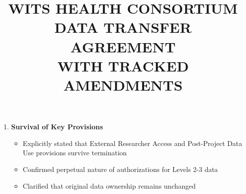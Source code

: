 \begin{enumerate}
\item \textbf{Survival of Key Provisions}
   \begin{itemize}
   \item Explicitly stated that External Researcher Access and Post-Project Data Use provisions survive termination
   \item Confirmed perpetual nature of authorizations for Levels 2-3 data
   \item Clarified that original data ownership remains unchanged
   \end{itemize}
\end{enumerate}

\documentclass[12pt,letterpaper]{article}
\usepackage{geometry}
\geometry{margin=1in}
\usepackage{titlesec}
\usepackage{enumitem}
\usepackage{xcolor}
\usepackage{soul} %
\usepackage{ulem} %
\usepackage{hyperref}
\hypersetup{
    colorlinks=true,
    linkcolor=blue,
    filecolor=magenta,
    urlcolor=blue,
}


\newcommand{\deleted}[1]{\textcolor{deletecolor}{\sout{#1}}}
\newcommand{\added}[1]{\textcolor{addcolor}{#1}}

\titleformat{\section}
  {\normalfont\Large\bfseries}{\thesection}{1em}{}
\titleformat{\subsection}
  {\normalfont\large\bfseries}{\thesubsection}{1em}{}


\title{\textbf{WITS HEALTH CONSORTIUM\\DATA TRANSFER AGREEMENT\\WITH TRACKED AMENDMENTS}}
\author{}
\date{}



\maketitle

\begin{center}
\textbf{LEGEND}\\
\textcolor{deletecolor}{Text in red with strikethrough} = Text to be removed\\
\textcolor{addcolor}{Text in blue} = Text to be added
\end{center}

